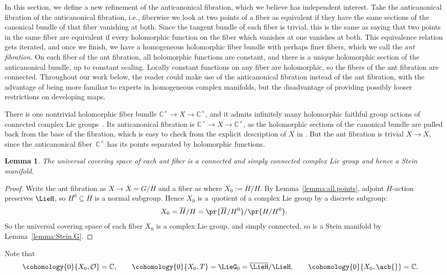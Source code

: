 \documentclass[pdftex]{sigma}
\numberwithin{equation}{section}
\newtheorem{Lemma}[Theorem]{Lemma}
\renewcommand{\C}{\mathbb{C}}
\newcommand{\OO}{\mathcal{O}}
\newcommand{\GZ}{G_0}
\begin{document}
In this section, we define a new refinement of the anticanonical fibration, which we believe has independent interest.
Take the anticanonical fibration of the anticanonical fibration, i.e., fiberwise we look at two points of a fiber as equivalent if they have the same sections of the canonical bundle of that fiber vanishing at both.
Since the tangent bundle of each fiber is trivial, this is the same as saying that two points in the same fiber are equivalent if every holomorphic function on the fiber which vanishes at one vanishes at both.
This equivalence relation gets iterated, and once we finish, we have a homogeneous holomorphic fiber bundle with perhaps finer fibers, which we call the \emph{ant fibration}.
On each fiber of the ant fibration, all holomorphic functions are constant, and there is a unique holomorphic section of the anticanonical bundle, up to constant scaling.
Locally constant functions on any fiber are holomorphic, so the fibers of the ant fibration are connected.
Throughout our work below, the reader could make use of the anticanonical fibration instead of the ant fibration, with the advantage of being more familiar to experts in homogeneous complex manifolds, but the disadvantage of providing possibly looser restrictions on developing maps.

\begin{Example}
There is one nontrivial holomorphic fiber bundle $\C^{\times} \to X \to \C^{\times}$, and it admits
infinitely many holomorphic faithful group actions of connected complex Lie groups~\cite{McKay:2015}. Its
anticanonical fibration is $\C^{\times} \to X \to \C^{\times}$, as the holomorphic sections of the
canonical bundle are pulled back from the base of the fibration, which is easy to check from the explicit
description of $X$ in \cite{McKay:2015}. But the ant fibration is trivial $X \to X$, since the
anticanonical fiber~$\C^{\times}$ has its points separated by holomorphic functions.
\end{Example}

\begin{Lemma}\label{lemma:ant.Stein}
The universal covering space of each ant fiber is a connected and simply connected complex Lie group and hence a Stein manifold.
\end{Lemma}

\begin{proof}
Write the ant fibration as $X\to \overline{X} = G/\overline{H}$ and a fiber as \pr{X_0,\GZ} where $X_0 := \overline{H}/H$.
By Lemma~\ref{lemma:all.points}, adjoint $\overline{H}$-action preserves $\LieH$, so $H^0 \subseteq \overline{H}$ is a normal subgroup.
Hence $X_0$ is a~quotient of a complex Lie group by a discrete subgroup:
\[
X_0 = \overline{H}/H = \pr{\overline{H}/H^0}/\pr{H/H^0}.
\]
So the universal covering space of each fiber $X_0$ is a complex Lie group, and simply connected, so is a Stein manifold by Lemma~\ref{lemma:Stein.G}.
\end{proof}
Note that
\begin{align*}
&\cohomology{0}{X_0,\OO}=\C,\qquad
\cohomology{0}{X_0,T}=\LieG_0=\overline{\LieH}/\LieH,\qquad
\cohomology{0}{X_0,\acb{}}=\C.
\end{align*}
\end{document}
